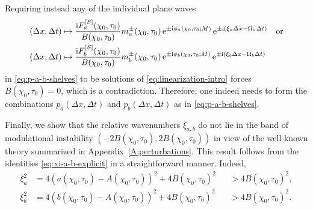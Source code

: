 \begin{remark}
Requiring instead any of the individual plane waves 
\begin{equation}
\begin{split}
(\Delta x, \Delta t) &\mapsto \frac{\mathrm{i} F_a^{[\mathcal{S}]}(\chi_0,\tau_0)}{B(\chi_0,\tau_0)}m_a^{\pm}(\chi_0,\tau_0)\,\mathrm{e}^{\pm \mathrm{i}\phi_a(\chi_0,\tau_0;M)} \,\mathrm{e}^{\pm \mathrm{i}(\xi_a \Delta x - \Omega_a \Delta t)}\quad\text{or}\\
(\Delta x, \Delta t) &\mapsto \frac{\mathrm{i} F_b^{[\mathcal{S}]}(\chi_0,\tau_0)}{B(\chi_0,\tau_0)}m_b^{\pm}(\chi_0,\tau_0)\,\mathrm{e}^{\pm \mathrm{i}\phi_b(\chi_0,\tau_0;M)} \,\mathrm{e}^{\pm \mathrm{i}(\xi_b \Delta x - \Omega_b \Delta t)}
\end{split}
\end{equation}
in \eqref{eq:p-a-b-shelves} to be solutions of \eqref{eq:linearization-intro} forces $B(\chi_0,\tau_0)=0$, which is a contradiction. Therefore, one indeed needs to form the combinations $p_a(\Delta x, \Delta t)$ and $p_b(\Delta x, \Delta t)$ as in \eqref{eq:p-a-b-shelves}.
\end{remark}
Finally, we show that the relative wavenumbers $\xi_{a,b}$ do not lie in the band of modulational instability $(-2 B(\chi_0,\tau_0), 2 B(\chi_0,\tau_0))$ in view of the well-known theory summarized in Appendix~\ref{A:perturbations}. This result follows from the identities \eqref{eq:xi-a-b-explicit} in a straightforward manner. Indeed,
\begin{equation}
\begin{alignedat}{3}
\xi_a^2 &= 4 \left( a(\chi_0,\tau_0) - A(\chi_0,\tau_0) \right)^2 + 4 B(\chi_0,\tau_0)^2 &&> 4 B(\chi_0,\tau_0)^2,
\\
\xi_b^2 &= 4 \left( b(\chi_0,\tau_0) - A(\chi_0,\tau_0) \right)^2 + 4 B(\chi_0,\tau_0)^2 &&> 4 B(\chi_0,\tau_0)^2.
\end{alignedat}
\end{equation}


